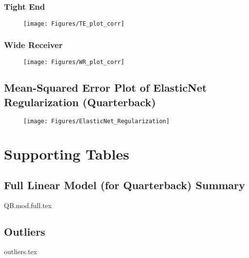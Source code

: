 \clearpage
\subsection{Tight End}
\begin{figure}[h]
	\centering
	\texttt{[image: Figures/TE\_plot\_corr]}
	\label{fig:teplotcorr}
\end{figure}

\subsection{Wide Receiver}
\begin{figure}[h]
	\centering
	\texttt{[image: Figures/WR\_plot\_corr]}
	\label{fig:wrplotcorr}
\end{figure}


\clearpage
\begin{landscape}
	\section{Mean-Squared Error Plot of ElasticNet Regularization (Quarterback)}
	\begin{figure}[h]
		\centering
		\texttt{[image: Figures/ElasticNet\_Regularization]}
		\label{fig:elasticnetregularization}
	\end{figure}
\end{landscape}




\chapter{Supporting Tables}
\label{app:supportingTables}

\section{Full Linear Model (for Quarterback) Summary}
\label{tab:full_lm_QB}
{QB.mod.full.tex}

\section{Outliers}
\label{tab:outliers}
{outliers.tex}



